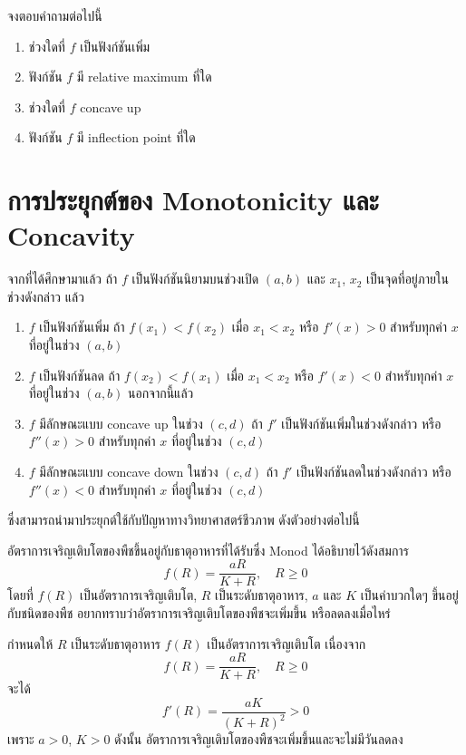 \documentclass[
]{book}
\begin{document}
จงตอบคำถามต่อไปนี้

\begin{enumerate}
\def\labelenumi{\arabic{enumi}.}
\item
  ช่วงใดที่ \(f\) เป็นฟังก์ชันเพิ่ม
\item
  ฟังก์ชัน \(f\) มี relative maximum ที่ใด
\item
  ช่วงใดที่ \(f\) concave up
\item
  ฟังก์ชัน \(f\) มี inflection point ที่ใด
\end{enumerate}

\section{การประยุกต์ของ Monotonicity และ
Concavity}\label{uxe01uxe32uxe23uxe1buxe23uxe30uxe22uxe01uxe15uxe02uxe2duxe07-monotonicity-uxe41uxe25uxe30-concavity}

จากที่ได้ศึกษามาแล้ว ถ้า \(f\) เป็นฟังก์ชันนิยามบนช่วงเปิด \((a,b)\) และ \(x_1\),
\(x_2\) เป็นจุดที่อยู่ภายในช่วงดังกล่าว แล้ว

\begin{enumerate}
\def\labelenumi{(\arabic{enumi})}
\item
  \(f\) เป็นฟังก์ชันเพิ่ม ถ้า \(f(x_1)<f(x_2)\) เมื่อ \(x_1<x_2\) หรือ \(f'(x)>0\)
  สำหรับทุกค่า \(x\) ที่อยู่ในช่วง \((a,b)\)
\item
  \(f\) เป็นฟังก์ชันลด ถ้า \(f(x_2)<f(x_1)\) เมื่อ \(x_1<x_2\) หรือ \(f'(x)<0\)
  สำหรับทุกค่า \(x\) ที่อยู่ในช่วง \((a,b)\) นอกจากนี้แล้ว
\item
  \(f\) มีลักษณะแบบ concave up ในช่วง \((c,d)\) ถ้า \(f'\)
  เป็นฟังก์ชันเพิ่มในช่วงดังกล่าว หรือ \(f''(x)>0\) สำหรับทุกค่า \(x\) ที่อยู่ในช่วง
  \((c,d)\)
\item
  \(f\) มีลักษณะแบบ concave down ในช่วง \((c,d)\) ถ้า \(f'\)
  เป็นฟังก์ชันลดในช่วงดังกล่าว หรือ \(f''(x)<0\) สำหรับทุกค่า \(x\) ที่อยู่ในช่วง
  \((c,d)\)
\end{enumerate}

ซึ่งสามารถนำมาประยุกต์ใช้กับปัญหาทางวิทยาศาสตร์ชีวภาพ ดังตัวอย่างต่อไปนี้

อัตราการเจริญเติบโตของพืชขึ้นอยู่กับธาตุอาหารที่ได้รับซึ่ง Monod ได้อธิบายไว้ดังสมการ
\[f(R)=\frac{aR}{K+R}, \quad R \ge 0\] โดยที่ \(f(R)\)
เป็นอัตราการเจริญเติบโต, \(R\) เป็นระดับธาตุอาหาร, \(a\) และ \(K\) เป็นค่าบวกใดๆ
ขึ้นอยู่กับชนิดของพืช อยากทราบว่าอัตราการเจริญเติบโตของพืชจะเพิ่มขึ้น หรือลดลงเมื่อไหร่

กำหนดให้ \(R\) เป็นระดับธาตุอาหาร \(f(R)\) เป็นอัตราการเจริญเติบโต เนื่องจาก
\[f(R)=\frac{aR}{K+R},  \quad      R \ge 0\] จะได้
\[f'(R)=\frac{aK}{(K+R)^2}>0\] เพราะ \(a>0\), \(K>0\) ดังนั้น
อัตราการเจริญเติบโตของพืชจะเพิ่มขึ้นและจะไม่มีวันลดลง
\end{document}
